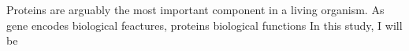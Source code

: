 Proteins are arguably the most important component in a living organism. As gene encodes biological feactures, proteins  biological functions   In this study, I will be 